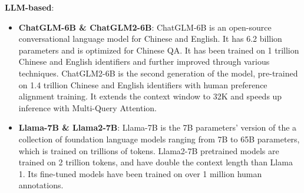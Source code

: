 \documentclass[conference]{IEEEtran}
\begin{document}
\textbf{LLM-based}:
\begin{itemize}
\item \textbf{ChatGLM-6B \& ChatGLM2-6B}: ChatGLM-6B is an open-source conversational language model \cite{du2022glm} for Chinese and English. It has 6.2 billion parameters and is optimized for Chinese QA. It has been trained on 1 trillion Chinese and English identifiers and further improved through various techniques. ChatGLM2-6B is the second generation of the model, pre-trained on 1.4 trillion Chinese and English identifiers with human preference alignment training. It extends the context window to 32K and speeds up inference with Multi-Query Attention.
\item \textbf{Llama-7B \&  Llama2-7B}: Llama-7B is the 7B parameters' version of the a collection of foundation language models \cite{touvron2023llama} ranging from 7B to 65B parameters, which is trained on trillions of tokens. 
Llama2-7B pretrained models are trained on 2 trillion tokens, and have double the context length than Llama 1. Its fine-tuned models have been trained on over 1 million human annotations.
\end{itemize}



\begin{table*}[htbp]
\caption{The statistics of datasets.  denotes the average number of utterances in a conversation. } 
	\centering
{} 
\label{tab:datasets_statics}	
\end{table*}
\end{document}
